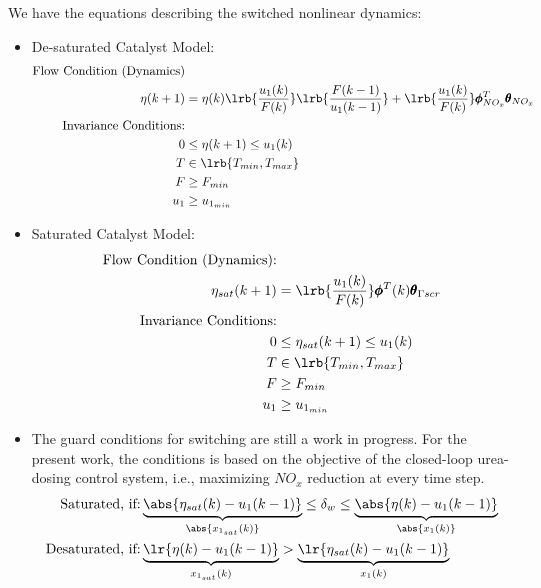We have the equations describing the switched nonlinear dynamics:
\begin{itemize}
\item De-saturated Catalyst Model:
\begin{align*}
        \text{Flow Condition (Dynamics)} &\\
                \eta(k+1) &= \eta(k) \lrb{\frac{u_1(k)}{F(k)}} \lrb{\frac{F(k-1)}{u_1(k-1)}}
        +\lrb{\frac{u_1(k)}{F(k)}} \pmb \phi_{NO_x}^T \pmb \theta_{NO_x}                    \\
        \text{Invariance Conditions:} & \\
                0 &\leq \eta (k+1) \leq u_1(k)\\
                T &\in \lrb{T_{min}, T_{max}}\\
                F &\geq F_{min}\\
                u_1 &\geq u_{1_{min}}
\end{align*}
\item Saturated Catalyst Model:
\begin{align*}
        \text{Flow Condition (Dynamics):} & \\
                \eta_{sat}(k+1) &= \lrb{\frac{u_1(k)}{F(k)}} \pmb \phi^T(k) \pmb \theta_{\Gamma scr}\\
        \text{Invariance Conditions:} & \\
                0 &\leq \eta_{sat} (k+1) \leq u_1(k)\\
                T &\in \lrb{T_{min}, T_{max}}\\
                F &\geq F_{min}\\
                u_1 &\geq u_{1_{min}}
\end{align*}

\item The guard conditions for switching are still a work in progress. For the present work, the conditions is based on the objective of the closed-loop urea-dosing control system, i.e., maximizing $NO_x$ reduction at every time step.
\begin{align*}
        \text{Saturated, if:} & \underbrace{\abs{\eta_{sat}(k) - u_1(k-1)}}_{\abs{{x_{1_{sat}}(k)}}} \leq \delta_w
                                \leq \underbrace{\abs{\eta(k) - u_1(k-1)}}_{\abs{x_1(k)}} \\
        \text{Desaturated, if:} & \underbrace{\lr{ \eta(k) - u_1(k-1)}}_{x_{1_{sat}}(k)} > \underbrace{\lr{\eta_{sat}(k) - u_1(k-1)}}_{x_1(k)}
\end{align*}
\end{itemize}



